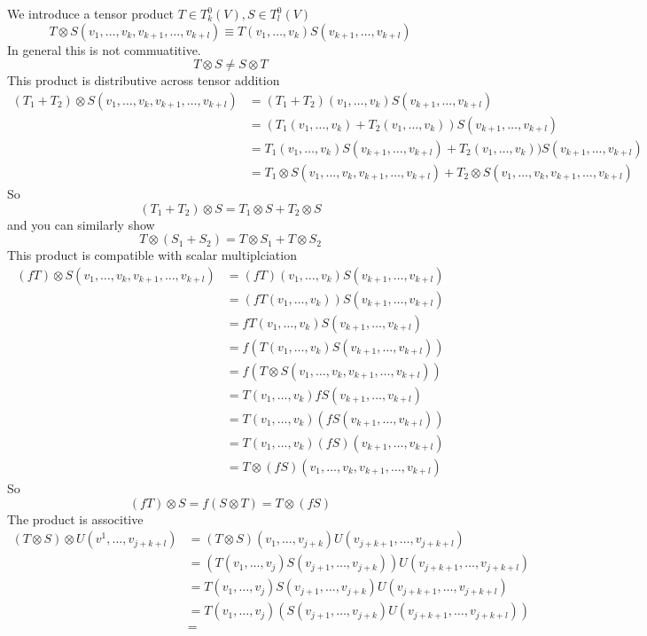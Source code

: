 \documentclass[a4paper]{scrartcl}
\begin{document}
We introduce a tensor product $T \in T_{k}^0(V), S \in T_{l}^0(V)$
$$T\otimes S(v_{1}, \ldots, v_{k},v_{k+1}, \ldots, v_{k+l}) \equiv 
T(v_{1}, \ldots, v_{k})S(v_{k+1}, \ldots, v_{k+l})$$
In general this is not commuatitive.
$$T\otimes S \neq S\otimes T$$
This product is distributive across tensor addition
\begin{align*}
(T_{1} + T_{2}) \otimes S(v_{1}, \ldots, v_{k},v_{k+1}, \ldots, v_{k+l}) &=
(T_{1} + T_{2})(v_{1}, \ldots, v_{k})S(v_{k+1}, \ldots, v_{k+l}) \\
&=(T_{1}(v_{1}, \ldots, v_{k})+T_{2}(v_{1}, \ldots, v_{k}))S(v_{k+1}, \ldots, v_{k+l}) \\
&=T_{1}(v_{1}, \ldots, v_{k})S(v_{k+1}, \ldots, v_{k+l}) + 
T_{2}(v_{1}, \ldots, v_{k}))S(v_{k+1}, \ldots, v_{k+l}) \\
&= T_{1} \otimes S(v_{1}, \ldots, v_{k},v_{k+1}, \ldots, v_{k+l}) +
T_{2} \otimes S(v_{1}, \ldots, v_{k},v_{k+1}, \ldots, v_{k+l})
\end{align*}
So
$$(T_{1} + T_{2}) \otimes S = T_{1} \otimes S + T_{2} \otimes S$$
and you can similarly show
$$T \otimes (S_{1} + S_{2}) = T \otimes S_{1} + T \otimes S_{2}$$
This product is compatible with scalar multiplciation
\begin{align*}
(fT) \otimes S(v_{1}, \ldots, v_{k},v_{k+1}, \ldots, v_{k+l}) &=
(fT)(v_{1}, \ldots, v_{k})S(v_{k+1}, \ldots, v_{k+l}) \\
&=(fT(v_{1}, \ldots, v_{k}))S(v_{k+1}, \ldots, v_{k+l}) \\
&=fT(v_{1}, \ldots, v_{k})S(v_{k+1}, \ldots, v_{k+l}) \\
&=f(T(v_{1}, \ldots, v_{k})S(v_{k+1}, \ldots, v_{k+l})) \\
&=f(T\otimes S(v_{1}, \ldots, v_{k},v_{k+1}, \ldots, v_{k+l})) \\
&=T(v_{1}, \ldots, v_{k})fS(v_{k+1}, \ldots, v_{k+l}) \\
&=T(v_{1}, \ldots, v_{k})(fS(v_{k+1}, \ldots, v_{k+l})) \\
&=T(v_{1}, \ldots, v_{k})(fS)(v_{k+1}, \ldots, v_{k+l}) \\
&=T \otimes(fS)(v_{1}, \ldots, v_{k},v_{k+1}, \ldots, v_{k+l})
\end{align*}
So
$$(fT) \otimes S = f(S \otimes T) = T \otimes (fS)$$
The product is associtive
\begin{align*}
(T\otimes S) \otimes U(v^{1},\ldots,v_{j+k+l}) &=
(T\otimes S)(v_{1},\ldots,v_{j+k})U(v_{j+k+1},\ldots,v_{j+k+l}) \\
&= (T(v_{1},\ldots,v_{j})S(v_{j+1},\ldots,v_{j+k}))U(v_{j+k+1},\ldots,v_{j+k+l}) \\
&= T(v_{1},\ldots,v_{j})S(v_{j+1},\ldots,v_{j+k})U(v_{j+k+1},\ldots,v_{j+k+l}) \\
&= T(v_{1},\ldots,v_{j})(S(v_{j+1},\ldots,v_{j+k})U(v_{j+k+1},\ldots,v_{j+k+l})) \\
&=
\end{align*}
\end{document}
